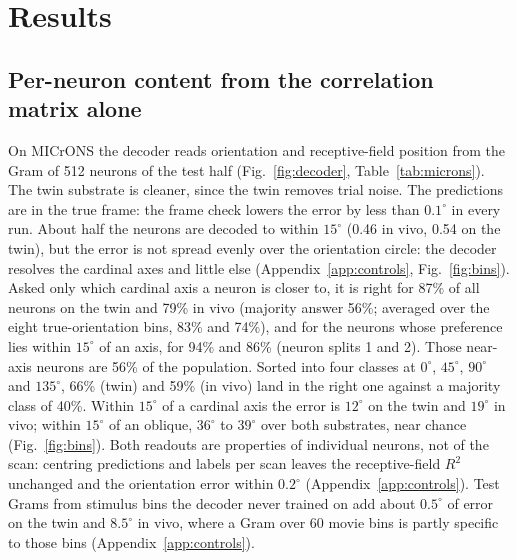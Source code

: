 \documentclass[11pt]{article}
\newcommand{\Rsq}{R^{2}}
\begin{document}
\section{Results}

\subsection{Per-neuron content from the correlation matrix alone}\label{sec:main}

On MICrONS the decoder reads orientation and receptive-field position from the Gram of 512 neurons of the test half (Fig.~\ref{fig:decoder}, Table~\ref{tab:microns}). The twin substrate is cleaner, since the twin removes trial noise. The predictions are in the true frame: the frame check lowers the error by less than $0.1^\circ$ in every run. About half the neurons are decoded to within $15^\circ$ (0.46 in vivo, 0.54 on the twin), but the error is not spread evenly over the orientation circle: the decoder resolves the cardinal axes and little else (Appendix~\ref{app:controls}, Fig.~\ref{fig:bins}). Asked only which cardinal axis a neuron is closer to, it is right for 87\% of all neurons on the twin and 79\% in vivo (majority answer 56\%; averaged over the eight true-orientation bins, 83\% and 74\%), and for the neurons whose preference lies within $15^\circ$ of an axis, for 94\% and 86\% (neuron splits 1 and 2). Those near-axis neurons are 56\% of the population. Sorted into four classes at $0^\circ$, $45^\circ$, $90^\circ$ and $135^\circ$, 66\% (twin) and 59\% (in vivo) land in the right one against a majority class of 40\%. Within $15^\circ$ of a cardinal axis the error is $12^\circ$ on the twin and $19^\circ$ in vivo; within $15^\circ$ of an oblique, $36^\circ$ to $39^\circ$ over both substrates, near chance (Fig.~\ref{fig:bins}). Both readouts are properties of individual neurons, not of the scan: centring predictions and labels per scan leaves the receptive-field $\Rsq$ unchanged and the orientation error within $0.2^\circ$ (Appendix~\ref{app:controls}). Test Grams from stimulus bins the decoder never trained on add about $0.5^\circ$ of error on the twin and $8.5^\circ$ in vivo, where a Gram over 60 movie bins is partly specific to those bins (Appendix~\ref{app:controls}).
\end{document}

